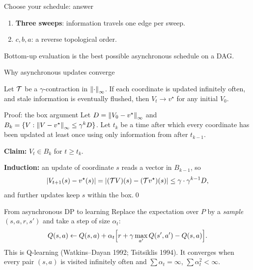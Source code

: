 \begin{frame}{Choose your schedule: answer}
	\begin{enumerate}
		\item \textbf{Three sweeps}: information travels one edge per sweep.
		\item $c,b,a$: a \alert{reverse topological order}.
	\end{enumerate}

	\seprule

	Bottom-up evaluation is the best possible asynchronous schedule on a DAG.
\end{frame}

\begin{frame}{Why asynchronous updates converge}
	\begin{theorem}
		Let $\mathcal{T}$ be a $\gamma$-contraction in $\left\lVert \cdot\right\rVert_\infty$. If each coordinate is updated infinitely often, and
		stale information is eventually flushed, then $V_t\to v^\star$ for any initial $V_0$.
	\end{theorem}
\end{frame}

\begin{frame}{Proof: the box argument}
	\small
	Let $D=\left\lVert V_0-v^\star\right\rVert_\infty$ and $B_k=\{V:\left\lVert V-v^\star\right\rVert_\infty\le\gamma^kD\}$.
	Let $t_k$ be a time after which every coordinate has been updated at least once using only information from
	after $t_{k-1}$.

	\vspace{0.5em}
	\textbf{Claim:} $V_t\in B_k$ for $t\ge t_k$.

	\vspace{0.5em}
	\textbf{Induction:} an update of coordinate $s$ reads a vector in $B_{k-1}$, so
	\[
		|V_{t+1}(s)-v^\star(s)|=|(\mathcal{T} V)(s)-(\mathcal{T} v^\star)(s)|\le\gamma\cdot\gamma^{k-1}D,
	\]
	and further updates keep $s$ within the box.\qed
\end{frame}

\begin{frame}{From asynchronous DP to learning}
	Replace the expectation over $P$ by a \emph{sample} $(s,a,r,s')$ and take a step of size $\alpha_t$:
	\[
		Q(s,a)\leftarrow Q(s,a)+\alpha_t\Bigl[r+\gamma\max_{a'}Q(s',a')-Q(s,a)\Bigr].
	\]
	This is \alert{Q-learning} (Watkins--Dayan 1992; Tsitsiklis 1994).
	It converges when every pair $(s,a)$ is visited infinitely often and $\sum\alpha_t=\infty$, $\sum\alpha_t^2<\infty$.
\end{frame}

